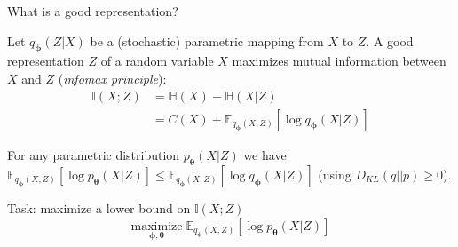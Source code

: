 \documentclass{beamer}
\begin{document}
  \begin{frame}{What is a good representation?}

    
    \small{Let $q_{\boldsymbol{\phi}}(Z|X)$ be a (stochastic) parametric mapping from $X$ to $Z$. A good representation $Z$ of a random variable $X$ maximizes \alert{mutual information} between $X$ and $Z$ (\emph{infomax principle}):}
    \vspace{0cm}
    \begin{align*}
      \mathbb{I}(X;Z) &= \mathbb{H}(X) - \mathbb{H}(X|Z)\\
                      &= C(X) + \mathbb{E}_{q_{\boldsymbol{\phi}}(X,Z)}\left[\log q_{\boldsymbol{\phi}}(X|Z)\right]
    \end{align*}

    \small{For any parametric distribution $p_{\boldsymbol{\theta}}(X|Z)$ we have $\mathbb{E}_{q_{\boldsymbol{\phi}}(X,Z)}\left[\log p_{\boldsymbol{\theta}}(X|Z)\right] \leq \mathbb{E}_{q_{\boldsymbol{\phi}}(X,Z)}\left[\log q_{\boldsymbol{\phi}}(X|Z)\right]$ (using $D_{KL}(q||p) \geq 0$).}

    \begin{block}{Task: maximize a lower bound on $\mathbb{I}(X;Z)$}
      \begin{equation*}
        \underset{\boldsymbol{\phi},\boldsymbol{\theta}}{\text{maximize}} \; \mathbb{E}_{q_{\boldsymbol{\phi}}(X,Z)}\left[\log p_{\boldsymbol{\theta}}(X|Z)\right]
      \end{equation*}
    \end{block}

  \end{frame}
\end{document}
